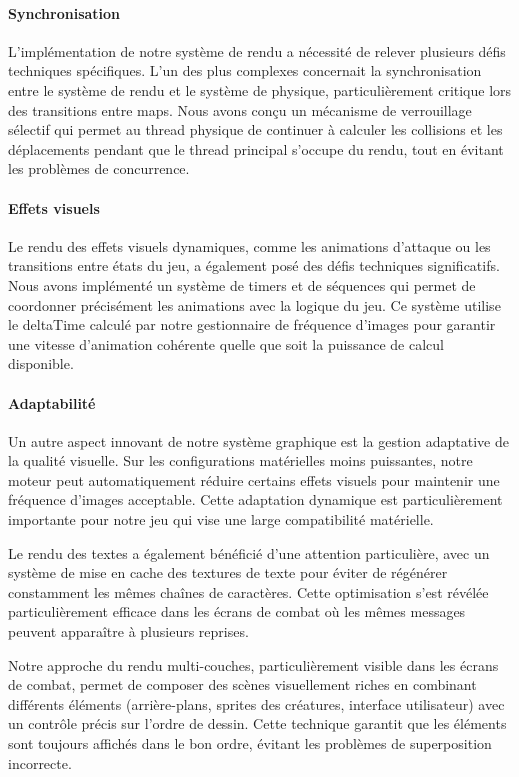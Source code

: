 \documentclass[12pt,a4paper, twoside]{article}
\begin{document}
\paragraph{Synchronisation} L'implémentation de notre système de rendu a nécessité de relever plusieurs défis techniques spécifiques. L'un des plus complexes concernait la synchronisation entre le système de rendu et le système de physique, particulièrement critique lors des transitions entre maps. Nous avons conçu un mécanisme de verrouillage sélectif qui permet au thread physique de continuer à calculer les collisions et les déplacements pendant que le thread principal s'occupe du rendu, tout en évitant les problèmes de concurrence.

\paragraph{Effets visuels} Le rendu des effets visuels dynamiques, comme les animations d'attaque ou les transitions entre états du jeu, a également posé des défis techniques significatifs. Nous avons implémenté un système de timers et de séquences qui permet de coordonner précisément les animations avec la logique du jeu. Ce système utilise le deltaTime calculé par notre gestionnaire de fréquence d'images pour garantir une vitesse d'animation cohérente quelle que soit la puissance de calcul disponible.

\paragraph{Adaptabilité} Un autre aspect innovant de notre système graphique est la gestion adaptative de la qualité visuelle. Sur les configurations matérielles moins puissantes, notre moteur peut automatiquement réduire certains effets visuels pour maintenir une fréquence d'images acceptable. Cette adaptation dynamique est particulièrement importante pour notre jeu qui vise une large compatibilité matérielle.

Le rendu des textes a également bénéficié d'une attention particulière, avec un système de mise en cache des textures de texte pour éviter de régénérer constamment les mêmes chaînes de caractères. Cette optimisation s'est révélée particulièrement efficace dans les écrans de combat où les mêmes messages peuvent apparaître à plusieurs reprises.

Notre approche du rendu multi-couches, particulièrement visible dans les écrans de combat, permet de composer des scènes visuellement riches en combinant différents éléments (arrière-plans, sprites des créatures, interface utilisateur) avec un contrôle précis sur l'ordre de dessin. Cette technique garantit que les éléments sont toujours affichés dans le bon ordre, évitant les problèmes de superposition incorrecte.
\end{document}
